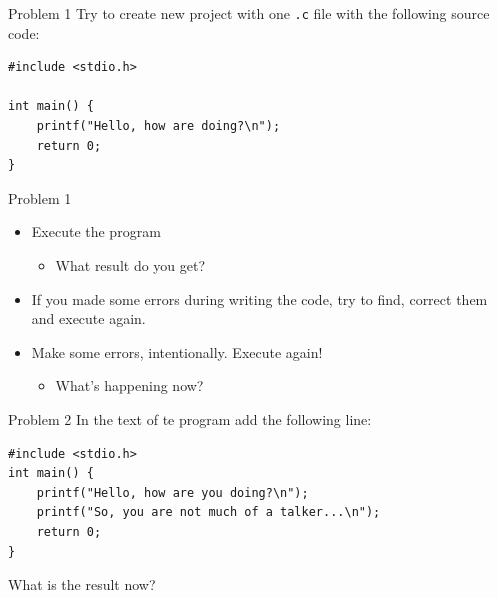 \begin{frame}[fragile]{Problem 1}
Try to create new project with one \texttt{.с} file with the following source
code:
\begin{lstlisting}
#include <stdio.h>

int main() {
    printf("Hello, how are doing?\n");
    return 0;
}
\end{lstlisting}

\end{frame}

\begin{frame}{Problem 1}
\begin{itemize}
  \item Execute the program
\begin{itemize}
  \item What result do you get?
\end{itemize}
  \item If you made some errors during writing the code, try to find,
  correct them and execute again.
  \item Make some errors, intentionally. Execute again!
\begin{itemize}
  \item What's happening now?
\end{itemize}
\end{itemize}
\end{frame}

\begin{frame}[fragile]{Problem 2}
In the text of te program add the following line:
\begin{lstlisting}
#include <stdio.h>
int main() {
    printf("Hello, how are you doing?\n");
    printf("So, you are not much of a talker...\n"); 
    return 0;
}
\end{lstlisting}
What is the result now?
\end{frame}
